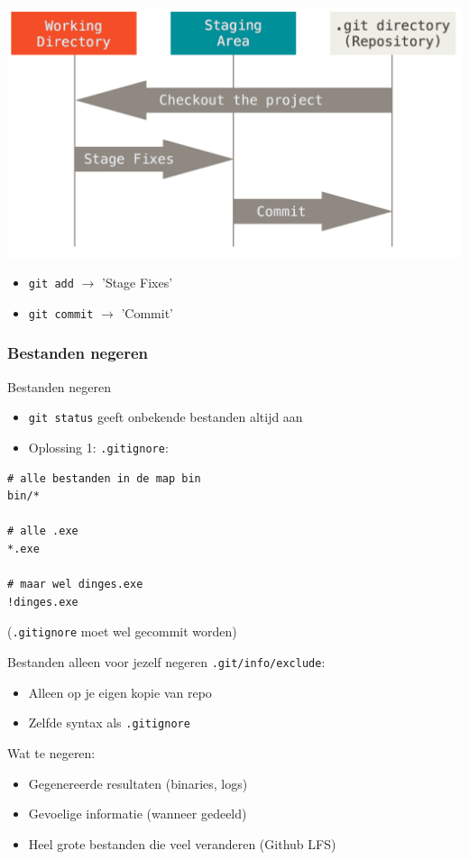 \begin{frame}
	\begin{center}
		\includegraphics[width=\textwidth]{images/areas}
	\end{center}
	\begin{itemize}
		\item \texttt{git add} $\rightarrow$ 'Stage Fixes'
		\item \texttt{git commit} $\rightarrow$ 'Commit'
	\end{itemize}
\end{frame}

\subsubsection{Bestanden negeren}
\begin{frame}[fragile]{Bestanden negeren}
	\begin{itemize}
		\item \texttt{git status} geeft onbekende bestanden altijd aan
		\item Oplossing 1: \texttt{.gitignore}:
	\end{itemize}
	\begin{verbatim}
# alle bestanden in de map bin
bin/*

# alle .exe
*.exe

# maar wel dinges.exe
!dinges.exe
	\end{verbatim}

	(\texttt{.gitignore} moet wel gecommit worden)
\end{frame}

\begin{frame}{Bestanden alleen voor jezelf negeren}
	\texttt{.git/info/exclude}:
	\begin{itemize}
		\item Alleen op je eigen kopie van repo
		\item Zelfde syntax als \texttt{.gitignore}
	\end{itemize}

	Wat te negeren:
	\begin{itemize}
		\item Gegenereerde resultaten (binaries, logs)
		\item Gevoelige informatie (wanneer gedeeld)
		\item Heel grote bestanden die veel veranderen (Github LFS)
	\end{itemize}
\end{frame}

